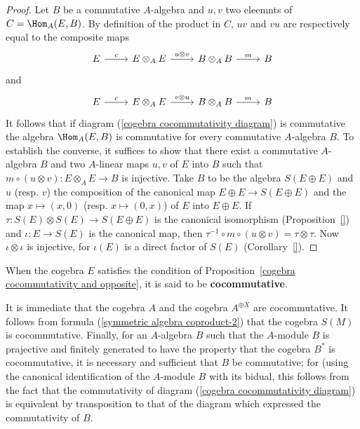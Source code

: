 \begin{proof}
Let $B$ be a commutative $A$-algebra and $u,v$ two eleemnts of $C=\Hom_A(E,B)$. By definition of the product in $C$, $uv$ and $vu$ are respectively equal to the composite maps
\[\begin{tikzcd}
E\ar[r,"c"]&E\otimes_AE\ar[r,"u\otimes v"]&B\otimes_AB\ar[r,"m"]&B
\end{tikzcd}\]
and
\[\begin{tikzcd}
E\ar[r,"c"]&E\otimes_AE\ar[r,"v\otimes u"]&B\otimes_AB\ar[r,"m"]&B
\end{tikzcd}\]
It follows that if diagram (\ref{cogebra cocommutativity diagram}) is commutative the algebra $\Hom_A(E,B)$ is commutative for every commutative $A$-algebra $B$. To establish the converse, it suffices to show that there exist a commutative $A$-algebra $B$ and two $A$-linear maps $u,v$ of $E$ into $B$ such that $m\circ(u\otimes v):E\otimes_AE\to B$ is injective. Take $B$ to be the algebra $S(E\oplus E)$ and $u$ (resp. $v$) the composition of the canonical map $E\oplus E\to S(E\oplus E)$ and the map $x\mapsto (x,0)$ (resp. $x\mapsto (0,x)$) of $E$ into $E\oplus E$. If $\tau:S(E)\otimes S(E)\to S(E\oplus E)$ is the canonical isomorphism (Proposition~\ref{}) and $\iota:E\to S(E)$ is the canonical map, then $\tau^{-1}\circ m\circ(u\otimes v)=\tau\otimes\tau$. Now $\iota\otimes\iota$ is injective, for $\iota(E)$ is a direct factor of $S(E)$ (Corollary~\ref{}).
\end{proof}
When the cogebra $E$ satisfies the condition of Proposition~\ref{cogebra cocommutativity and opposite}, it is said to be \textbf{cocommutative}.
\begin{example}
It is immediate that the cogebra $A$ and the cogebra $A^{\oplus X}$ are cocommutative. It follows from formula (\ref{symmetric algebra coproduct-2}) that the cogebra $S(M)$ is cocommutative. Finally, for an $A$-algebra $B$ such that the $A$-module $B$ is prajective and finitely generated to have the property that the cogebra $B^*$ is cocommutative, it is necessary and sufficient that $B$ be commutative; for (using the canonical identification of the $A$-module $B$ with its bidual, this follows from the fact that the commutativity of diagram (\ref{cogebra cocommutativity diagram}) is equivalent by transposition to that of the diagram which expressed the commutativity of $B$.
\end{example}
